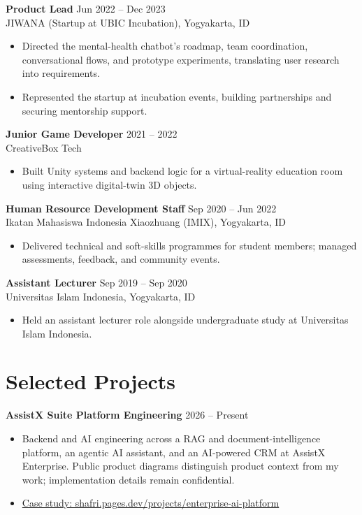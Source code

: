 \documentclass[10pt,a4paper]{article}
\begin{document}
\textbf{Product Lead} \hfill Jun 2022 -- Dec 2023\\
JIWANA (Startup at UBIC Incubation), Yogyakarta, ID
\begin{itemize}
  \item Directed the mental-health chatbot's roadmap, team coordination, conversational flows, and prototype experiments, translating user research into requirements.
  \item Represented the startup at incubation events, building partnerships and securing mentorship support.
\end{itemize}

\textbf{Junior Game Developer} \hfill 2021 -- 2022\\
CreativeBox Tech
\begin{itemize}
  \item Built Unity systems and backend logic for a virtual-reality education room using interactive digital-twin 3D objects.
\end{itemize}

\textbf{Human Resource Development Staff} \hfill Sep 2020 -- Jun 2022\\
Ikatan Mahasiswa Indonesia Xiaozhuang (IMIX), Yogyakarta, ID
\begin{itemize}
  \item Delivered technical and soft-skills programmes for student members; managed assessments, feedback, and community events.
\end{itemize}

\textbf{Assistant Lecturer} \hfill Sep 2019 -- Sep 2020\\
Universitas Islam Indonesia, Yogyakarta, ID
\begin{itemize}
  \item Held an assistant lecturer role alongside undergraduate study at Universitas Islam Indonesia.
\end{itemize}

\newpage
\section*{Selected Projects}
\textbf{AssistX Suite Platform Engineering} \hfill 2026 -- Present
\begin{itemize}
  \item Backend and AI engineering across a RAG and document-intelligence platform, an agentic AI assistant, and an AI-powered CRM at AssistX Enterprise. Public product diagrams distinguish product context from my work; implementation details remain confidential.
  \item \href{https://shafri.pages.dev/projects/enterprise-ai-platform}{Case study: shafri.pages.dev/projects/enterprise-ai-platform}
\end{itemize}
\end{document}
